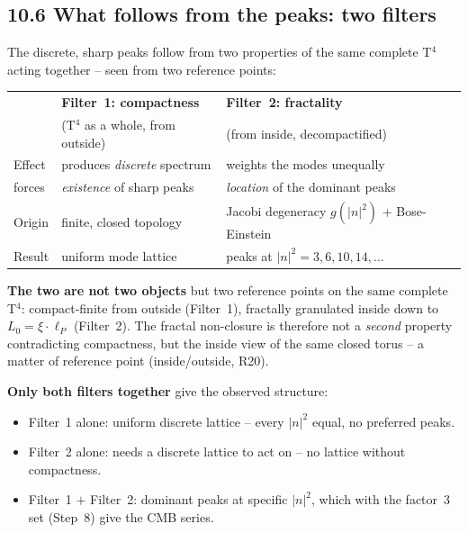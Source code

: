 \subsection*{10.6 What follows from the peaks: two filters}

The discrete, sharp peaks follow from two properties of the same
complete T$^4$ acting together -- seen from two reference points:

\begin{center}
\begin{tabular}{p{2.2cm}p{4.6cm}p{4.6cm}}
\toprule
 & \textbf{Filter~1: compactness} & \textbf{Filter~2: fractality} \\
 & (T$^4$ as a whole, from outside) & (from inside, decompactified) \\
\midrule
Effect & produces \emph{discrete} spectrum &
  weights the modes unequally \\
\addlinespace
forces & \emph{existence} of sharp peaks &
  \emph{location} of the dominant peaks \\
\addlinespace
Origin & finite, closed topology &
  Jacobi degeneracy $g(|n|^2)$ + Bose-Einstein \\
\addlinespace
Result & uniform mode lattice &
  peaks at $|n|^2 = 3, 6, 10, 14, \ldots$ \\
\bottomrule
\end{tabular}
\end{center}

\textbf{The two are not two objects} but two reference points on
the same complete T$^4$: compact-finite from outside (Filter~1),
fractally granulated inside down to $L_0 = \xi\cdot\ell_P$ (Filter~2).
The fractal non-closure is therefore not a \emph{second} property
contradicting compactness, but the inside view of the same closed
torus -- a matter of reference point (inside/outside, R20).

\textbf{Only both filters together} give the observed structure:
\begin{itemize}
  \item Filter~1 alone: uniform discrete lattice -- every
        $|n|^2$ equal, no preferred peaks.
  \item Filter~2 alone: needs a discrete lattice to act on --
        no lattice without compactness.
  \item Filter~1 $+$ Filter~2: dominant peaks at specific $|n|^2$,
        which with the factor~3 set (Step~8) give the CMB series.
\end{itemize}

